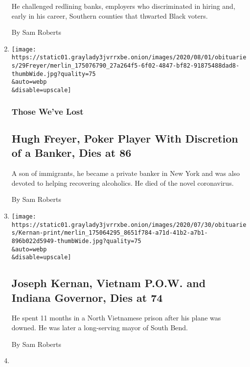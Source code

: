 \begin{enumerate}
  He challenged redlining banks, employers who discriminated in hiring
  and, early in his career, Southern counties that thwarted Black
  voters.

  By Sam Roberts
\item
  \href{/2020/07/30/obituaries/hugh-freyer-dead-coronavirus.html}{}

  \texttt{[image: https://static01.graylady3jvrrxbe.onion/images/2020/08/01/obituaries/29Freyer/merlin\_175076790\_27a264f5-6f02-4847-bf82-91875488dad8-thumbWide.jpg?quality=75\\\&auto=webp\\\&disable=upscale]}

  \hypertarget{those-weve-lost}{%
  \subsubsection{Those We've Lost}\label{those-weve-lost}}

  \hypertarget{hugh-freyer-poker-player-with-discretion-of-a-banker-dies-at-86}{%
  \subsection{Hugh Freyer, Poker Player With Discretion of a Banker,
  Dies at
  86}\label{hugh-freyer-poker-player-with-discretion-of-a-banker-dies-at-86}}

  A son of immigrants, he became a private banker in New York and was
  also devoted to helping recovering alcoholics. He died of the novel
  coronavirus.

  By Sam Roberts
\item
  \href{/2020/07/29/us/politics/joseph-kernan-dead.html}{}

  \texttt{[image: https://static01.graylady3jvrrxbe.onion/images/2020/07/30/obituaries/Kernan-print/merlin\_175064295\_8651f784-a71d-41b2-a7b1-896b022d5949-thumbWide.jpg?quality=75\\\&auto=webp\\\&disable=upscale]}

  \hypertarget{joseph-kernan-vietnam-pow-and-indiana-governor-dies-at-74}{%
  \subsection{Joseph Kernan, Vietnam P.O.W. and Indiana Governor, Dies
  at
  74}\label{joseph-kernan-vietnam-pow-and-indiana-governor-dies-at-74}}

  He spent 11 months in a North Vietnamese prison after his plane was
  downed. He was later a long-serving mayor of South Bend.

  By Sam Roberts
\item
  \href{/2020/07/24/us/bruce-blair-dead.html}{}


\end{enumerate}
